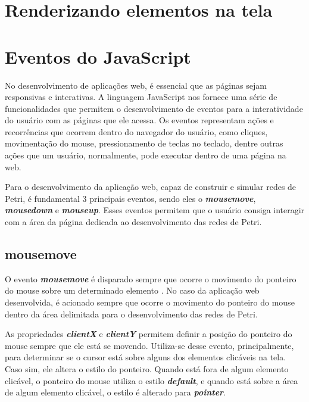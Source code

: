 \documentclass[
	12pt,				%
	openright,			%
	oneside,			%
	a4paper,			%
	english,			%
	brazil				%
	]{abntex2}
\begin{document}
\section{Renderizando elementos na tela}

\section{Eventos do JavaScript}

No desenvolvimento de aplicações web, é essencial que as páginas sejam responsivas e interativas. A linguagem JavaScript nos fornece uma série de funcionalidades que permitem o desenvolvimento de eventos para a interatividade do usuário com as páginas que ele acessa. Os eventos representam ações e recorrências que ocorrem dentro do navegador do usuário, como cliques, movimentação do mouse, pressionamento de teclas no teclado, dentre outras ações que um usuário, normalmente, pode executar dentro de uma página na web. 

Para o desenvolvimento da aplicação web, capaz de construir e simular redes de Petri, é fundamental 3 principais eventos, sendo eles o \textbf{\textit{mousemove}}, \textbf{\textit{mousedown}} e \textbf{\textit{mouseup}}. Esses eventos permitem que o usuário consiga interagir com a área da página dedicada ao desenvolvimento das redes de Petri. 

\subsection*{mousemove}

O evento \textbf{\textit{mousemove}} é disparado sempre que ocorre o movimento do ponteiro do mouse sobre um determinado elemento \cite{mdn_mousemove_event}. No caso da aplicação web desenvolvida, é acionado sempre que ocorre o movimento do ponteiro do mouse dentro da área delimitada para o desenvolvimento das redes de Petri. 



As propriedades \textbf{\textit{clientX}} e \textbf{\textit{clientY}} permitem definir a posição do ponteiro do mouse sempre que ele está se movendo. Utiliza-se desse evento, principalmente, para determinar se o cursor está sobre alguns dos elementos clicáveis na tela. Caso sim, ele altera o estilo do ponteiro. Quando está fora de algum elemento clicável, o ponteiro do mouse utiliza o estilo \textbf{\textit{default}}, e quando está sobre a área de algum elemento clicável, o estilo é alterado para \textbf{\textit{pointer}}.
\end{document}
